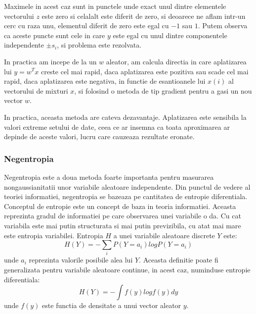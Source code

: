 \documentclass[12pt,oneside]{article}
\begin{document}
Maximele in acest caz sunt in punctele unde exact unul dintre elementele vectorului $z$ este zero si celalalt este diferit de zero, si deoarece ne aflam intr-un cerc cu raza unu, elementul diferit de zero este egal cu $-1$ sau $1$. Putem observa ca aceste puncte sunt cele in care $y$ este egal cu unul dintre componentele independente $\pm s_i$, si problema este rezolvata.

In practica am incepe de la un $w$ aleator, am calcula directia in care aplatizarea lui $y=w^Tx$ creste cel mai rapid, daca aplatizarea este pozitiva sau scade cel mai rapid, daca aplatizarea este negativa, in functie de esantioanele lui $x(i)$ al vectorului de mixturi $x$, si folosind o metoda de tip gradient pentru a gasi un nou vector $w$.

In practica, aceasta metoda are cateva dezavantaje. Aplatizarea este sensibila la valori extreme setului de date, ceea ce ar insemna ca toata aproximarea ar depinde de aceste valori, lucru care cauzeaza rezultate eronate.

\subsubsection{Negentropia}
Negentropia este a doua metoda foarte importanta pentru masurarea nongaussianitatii unor variabile aleatoare independente. Din punctul de vedere al teoriei informatiei, negentropia se bazeaza pe cantitatea de entropie diferentiala. Conceptul de entropie este un concept de baza in teoria informatiei. Aceasta reprezinta gradul de informatiei pe care observarea unei variabile o da. Cu cat variabila este mai putin structurata si mai putin previzibila, cu atat mai mare este entropia variabilei. Entropia $H$ a unei variabile aleatoare discrete $Y$ este:
\begin{equation}
	H(Y)=-\sum_i P(Y=a_i)log P(Y=a_i)
\end{equation}
unde $a_i$ reprezinta valorile posibile alea lui $Y$. Aceasta definitie poate fi generalizata pentru variabile aleatoare continue, in acest caz, numinduse entropie diferentiala:
\begin{equation}
H(Y)=-\int f(y) logf(y)dy	
\end{equation}
unde $f(y)$ este functia de densitate a unui vector aleator $y$.
\end{document}
